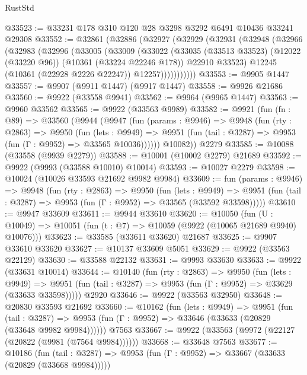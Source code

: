 \begin{lexlean}{RustStd}
\begin{coremodule}
@33523 := @33231 @178 @310 @120 @28 @3298 @3292 @6491 @10436 @33241 @29308
@33552 := @32861
    (@32886
      (@32927
        (@32929
          (@32931
            (@32948
              (@32966
                (@32983
                  (@32996
                    (@33005
                      (@33009
                        (@33022
                          (@33035
                            (@33513 @33523)
                            (@12022 (@33220 @96))
                            (@10361 (@33224 @22246 @178))
                            @22910
                            @33523)
                          @12245
                          (@10361 (@22928 @2226 @22247))
                          @12257)))))))))))
@33553 := @9905 @1447
@33557 := @9907 (@9911 @1447) (@9917 @1447)
@33558 := @9926 @21686
@33560 := @9922 (@33558 @9941)
@33562 := @9964 (@9965 @1447)
@33563 := @9960 @33562
@33565 := @9922 (@33563 @9989)
@33582 := @9921
    (fun (fn : @89) =>
    @33560
      (@9944
        (@9947
          (fun (params : @9946) =>
          @9948
            (fun (rty : @2863) =>
            @9950
              (fun (lets : @9949) =>
              @9951 (fun (tail : @3287) => @9953 (fun (Γ : @9952) => @33565 @10036))))))
        @10082))
    @2279
@33585 := @10088 (@33558 (@9939 @2279))
@33588 := @10001 (@10002 @2279) @21689
@33592 := @9922 (@9993 (@33588 @10010) @10014)
@33593 := @10027 @2279
@33598 := @10024 (@10026 @33593 @21692 @9982 @9984)
@33609 := fun (params : @9946) =>
  @9948
    (fun (rty : @2863) =>
    @9950
      (fun (lets : @9949) =>
      @9951 (fun (tail : @3287) => @9953 (fun (Γ : @9952) => @33565 (@33592 @33598)))))
@33610 := @9947 @33609
@33611 := @9944 @33610
@33620 := @10050
    (fun (U : @10049) => @10051 (fun (t : @7) => @10059 (@9922 (@10065 @21689 @9940) @10076)))
@33623 := @33585 (@33611 @33620) @21687
@33625 := @9907 @33610 @33620
@33627 := @10137 @33609 @5051
@33629 := @9922 (@33563 @22129)
@33630 := @33588 @22132
@33631 := @9993 @33630
@33633 := @9922 (@33631 @10014)
@33644 := @10140
    (fun (rty : @2863) =>
    @9950
      (fun (lets : @9949) =>
      @9951 (fun (tail : @3287) => @9953 (fun (Γ : @9952) => @33629 (@33633 @33598)))))
    @2920
@33646 := @9922 (@33563 @32950)
@33648 := @20830 @33593 @21692
@33660 := @10162
    (fun (lets : @9949) =>
    @9951
      (fun (tail : @3287) =>
      @9953 (fun (Γ : @9952) => @33646 (@33633 (@20829 (@33648 @9982 @9984))))))
    @7563
@33667 := @9922 (@33563 (@9972 (@22127 (@20822 (@9981 (@7564 @9984))))))
@33668 := @33648 @7563
@33677 := @10186
    (fun (tail : @3287) => @9953 (fun (Γ : @9952) => @33667 (@33633 (@20829 (@33668 @9984)))))

\end{coremodule}
\end{lexlean}

